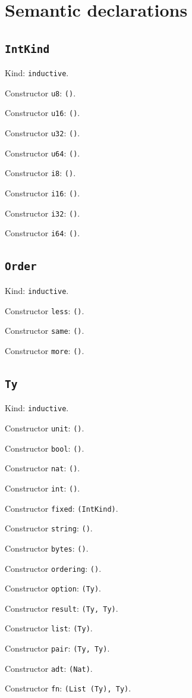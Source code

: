 \documentclass[11pt]{article}
\begin{document}
\section*{Semantic declarations}
\subsection*{\texttt{IntKind}}
\noindent Kind: \texttt{inductive}.\par
\noindent Constructor \texttt{u8}: \texttt{()}.\par
\noindent Constructor \texttt{u16}: \texttt{()}.\par
\noindent Constructor \texttt{u32}: \texttt{()}.\par
\noindent Constructor \texttt{u64}: \texttt{()}.\par
\noindent Constructor \texttt{i8}: \texttt{()}.\par
\noindent Constructor \texttt{i16}: \texttt{()}.\par
\noindent Constructor \texttt{i32}: \texttt{()}.\par
\noindent Constructor \texttt{i64}: \texttt{()}.\par
\subsection*{\texttt{Order}}
\noindent Kind: \texttt{inductive}.\par
\noindent Constructor \texttt{less}: \texttt{()}.\par
\noindent Constructor \texttt{same}: \texttt{()}.\par
\noindent Constructor \texttt{more}: \texttt{()}.\par
\subsection*{\texttt{Ty}}
\noindent Kind: \texttt{inductive}.\par
\noindent Constructor \texttt{unit}: \texttt{()}.\par
\noindent Constructor \texttt{bool}: \texttt{()}.\par
\noindent Constructor \texttt{nat}: \texttt{()}.\par
\noindent Constructor \texttt{int}: \texttt{()}.\par
\noindent Constructor \texttt{fixed}: \texttt{(IntKind)}.\par
\noindent Constructor \texttt{string}: \texttt{()}.\par
\noindent Constructor \texttt{bytes}: \texttt{()}.\par
\noindent Constructor \texttt{ordering}: \texttt{()}.\par
\noindent Constructor \texttt{option}: \texttt{(Ty)}.\par
\noindent Constructor \texttt{result}: \texttt{(Ty, Ty)}.\par
\noindent Constructor \texttt{list}: \texttt{(Ty)}.\par
\noindent Constructor \texttt{pair}: \texttt{(Ty, Ty)}.\par
\noindent Constructor \texttt{adt}: \texttt{(Nat)}.\par
\noindent Constructor \texttt{fn}: \texttt{(List (Ty), Ty)}.\par
\end{document}
